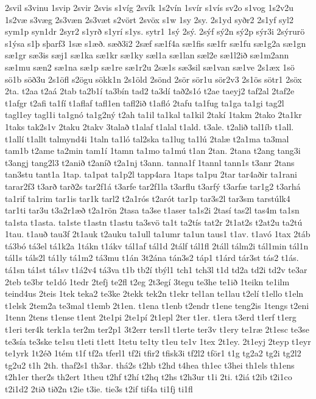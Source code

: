 {2svil
s3vinu
1svip
2svir
2svis
s1víg
2svík
1s2vín
1svír
s1vís
sv2o
s1vog
1s2v2u
1s2væ
s3væg
2s3væn
2s3væt
s2vört
2svöx
s1w
1sy
2sy.
2s1yd
syðr2
2s1yf
syl2
sym1p
syn1dr
2syr2
s1yrð
s1yrí
s1ys.
sytr1
1sý
2sý.
2sýf
sý2n
sý2p
sýr3i
2sýrurö
s1ýsa
s1þ
sþarf3
1sæ
s1æð.
sæð3i2
2sæf
sæ1f4a
sæ1fis
sæ1fr
sæ1fu
sæ1g2a
sæ1gn
sæ1gr
sæ3is
sæj1
sæ1ka
sæ1kr
sæ1ky
sæl1a
sæ1lan
sæl2e
sæ1l2ið
sæ1m2ann
sæ1mu
sæn2
sæ1na
sæ1p
sæ1re
sæ1r2u
2sæ1s
sæ3sil
sæ1van
sæ1ve
2s1æx
1sö
sö1b
söð3u
2s1öfl
s2ögu
sökk1n
2s1öld
2sönd
2sör
sör1u
sör2v3
2s1ös
sötr1
2söx
2ta.
t2aa
t2aá
2tab
ta2b1í
ta3bín
tad2
ta3dí
tað2s1ó
t2ae
taeyj2
taf2al
2taf2e
t1afgr
t2afi
ta1fí
t1aflaf
tafl1en
tafl2ið
t1afló
2tafu
ta1fug
ta1ga
ta1gi
tag2l
tagl1ey
tagl1i
ta1gnó
ta1g2ný
t2ah
ta1il
ta1kal
ta1kil
2takí
1takm
2tako
2ta1kr
1taks
tak2s1v
2taku
2takv
3talað
t1alaf
t1alal
t1ald.
t3ale.
t2alið
tal1íb
t1all.
t1allí
t1allt
talmynd4i
1taln
ta1ló
tal2ska
ta1lug
ta1lú
2talæ
t2a1ma
ta3mal
tam1b
t2ame
ta2min
tam1í
1tamn
ta1mo
ta1mú
t1an
2tan.
2tana
t2ang
tang3i
t3angj
tang2l3
t2anið
t2aníð
t2a1nj
t3ann.
tanna1f
1tannl
tann1s
t3anr
2tans
tan3stu
tant1a
1tap.
ta1pat
ta1p2l
tapp4ara
1taps
ta1pu
2tar
tar4aðir
ta1rani
tarar2f3
t3arð
tarð2s
tar2f1á
t3arfe
tar2f1la
t3arflu
t3arfý
t3arfæ
tar1g2
t3arhá
ta1rif
ta1rim
tar1is
tar1k
tarl2
t2a1rós
t2arót
tar1p
tar3s2l
tar3sm
tarstúlk4
tar1ti
tar3u
t3a2r1æð
t2a1rön
2tasa
ta3se
t1aser
ta1s2i
2tasí
tas2l
tas4m
ta1sn
ta1sta
t1asta.
ta1ste
t1astn
t1astu
ta3svö
ta1t
ta2tís
tat2r
2t1at2s
t2at2u
ta2tú
1tau.
t1auð
tau3f
2t1auk
t2auku
ta1ull
ta1umr
ta1un
taus1
t1av.
t1avó
1tax
2táb
tá3bó
tá3el
tá1k2a
1tákn
t1ákv
tál1af
tál1d
2tálf
tál1fl
2táll
tálm2i
tál1min
tál1n
tál1s
táls2l
tá1ly
tá1m2
tá3mu
t1án
3t2ána
tán3s2
táp1
t1árd
tár3st
tás2
t1ás.
tá1sn
tá1st
tá1sv
t1á2v4
tá3va
t1b
tb2í
tbýl1
tch1
tch3l
t1d
td2a
td2i
td2v
te3ar
2teb
te3br
te1dó
1tedr
2tefj
te2fl
t2eg
2t3egí
3tegu
te3he
te1ið
1teikn
te1ilm
teind4us
2teis
1tek
teka2
te3ke
2tekk
tek2n
t1ekr
tel1an
te1lau
t2elí
t1ello
t1eln
t1elsk
2tem2a
te3mal
t1emb
2t1en.
t1ena
t1enb
t2endr
t1ene
teng2is
1tengs
t2eni
1tenn
2tens
t1ense
t1ent
2te1pi
2te1pí
2t1epl
2ter
t1er.
t1era
t3erd
t1erf
t1erg
t1eri
ter4k
terk1a
ter2m
ter2p1
3t2err
ters1l
t1erte
ter3v
t1ery
te1ræ
2t1esc
te3se
te3sía
te3ske
te1su
t1eti
t1ett
1tetu
te1ty
t1eu
te1v
1tex
2t1ey.
2t1eyj
2teyp
t1eyr
te1yrk
1t2éð
1tém
t1f
tf2a
tferl1
tf2i
tfir2
tfisk3i
tf2l2
tför1
t1g
tg2a2
tg2i
tg2l2
tg2u2
t1h
2th.
thaf2s1
th3ar.
thá2s
t2hb
t2hd
t4hea
th1ec
t3hei
th1els
th1ens
t2h1er
ther2s
th2ert
1theu
t2hf
t2hí
t2hq
t2hs
t2h3ur
t1i
2ti.
t2iá
t2ib
t2i1co
t2i1d2
2tið
tið2n
t2ie
t3ie.
tie3s
t2if
tif4a
ti1fj
ti1fl
}
